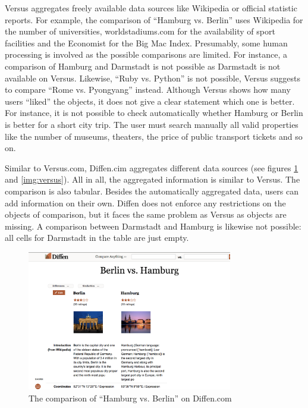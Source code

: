 Versus aggregates freely available data sources like Wikipedia or official statistic reports. For example, the comparison of \enquote{Hamburg vs. Berlin} uses Wikipedia for the number of universities, worldstadiums.com for the availability of sport facilities and the Economist for the Big Mac Index. Presumably, some human processing is involved as the possible comparisons are limited. For instance, a comparison of Hamburg and Darmstadt is not possible as Darmstadt is not available on Versus. Likewise, \enquote{Ruby vs. Python} is not possible, Versus suggests to compare \enquote{Rome vs. Pyongyang} instead. Although Versus shows how many users \enquote{liked} the objects, it does not give a clear statement which one is better. For instance, it is not possible to check automatically whether Hamburg or Berlin is better for a short city trip. The user must search manually all valid properties like the number of museums, theaters, the price of public transport tickets and so on.

Similar to Versus.com, Diffen.cim aggregates different data sources (see figures \ref{img:diffen} and \ref{img:versus}). All in all, the aggregated information is similar to Versus. The comparison is also tabular. Besides the automatically aggregated data, users can add information on their own. Diffen does not enforce any restrictions on the objects of comparison, but it faces the same problem as Versus as objects are missing. A comparison between Darmstadt and Hamburg is likewise not possible: all cells for Darmstadt in the table are just empty.

\begin{figure}[htp]
 \centering
	\includegraphics[width=0.8\textwidth]{images/ds-sys/diffen}
	\caption{The comparison of \enquote{Hamburg vs. Berlin} on Diffen.com}
		\label{img:diffen}
\end{figure}

